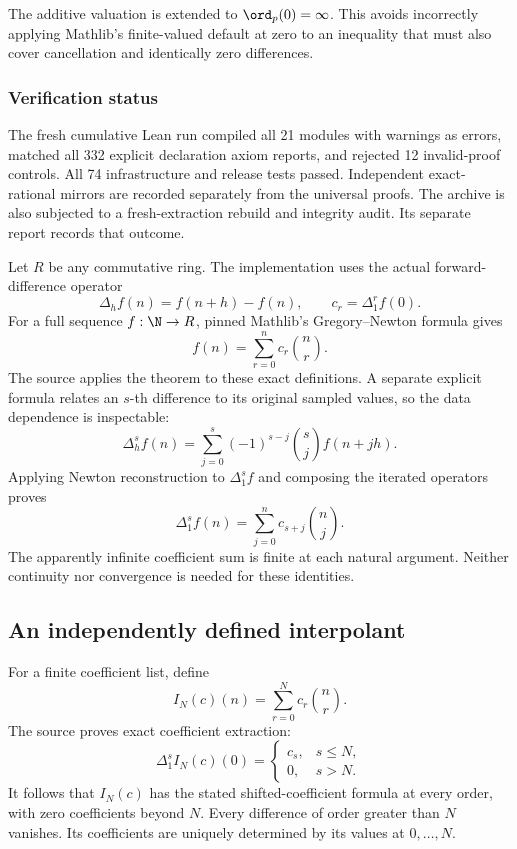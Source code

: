 The additive valuation is extended to $\ord_p(0)=\infty$. This avoids incorrectly applying Mathlib's finite-valued default at zero to an inequality that must also cover cancellation and identically zero differences.

\subsubsection*{Verification status}
The fresh cumulative Lean run compiled all 21 modules with warnings as errors, matched all 332 explicit declaration axiom reports, and rejected 12 invalid-proof controls. All 74 infrastructure and release tests passed. Independent exact-rational mirrors are recorded separately from the universal proofs. The archive is also subjected to a fresh-extraction rebuild and integrity audit. Its separate report records that outcome.
\par\medskip
{}
Let $R$ be any commutative ring. The implementation uses the actual forward-difference operator
\[
 \Delta_h f(n)=f(n+h)-f(n),\qquad c_r=\Delta_1^r f(0).
\]
For a full sequence $f:\N\to R$, pinned Mathlib's Gregory--Newton formula gives
\[
 \boxed{f(n)=\sum_{r=0}^{n}c_r\binom nr.}
\]
The source applies the theorem to these exact definitions. A separate explicit formula relates an $s$-th difference to its original sampled values, so the data dependence is inspectable:
\[
 \Delta_h^s f(n)=\sum_{j=0}^{s}(-1)^{s-j}\binom sj f(n+jh).
\]
Applying Newton reconstruction to $\Delta_1^s f$ and composing the iterated operators proves
\[
 \boxed{\Delta_1^s f(n)=\sum_{j=0}^{n}c_{s+j}\binom nj.}
\]
The apparently infinite coefficient sum is finite at each natural argument. Neither continuity nor convergence is needed for these identities.

\subsection*{An independently defined interpolant}
For a finite coefficient list, define
\[
 I_N(c)(n)=\sum_{r=0}^{N}c_r\binom nr.
\]
The source proves exact coefficient extraction:
\[
 \Delta_1^s I_N(c)(0)=
 \begin{cases}c_s,&s\leq N,\\0,&s>N.\end{cases}
\]
It follows that $I_N(c)$ has the stated shifted-coefficient formula at every order, with zero coefficients beyond $N$. Every difference of order greater than $N$ vanishes. Its coefficients are uniquely determined by its values at $0,\ldots,N$.

